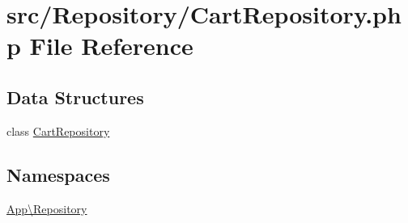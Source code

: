 \hypertarget{_cart_repository_8php}{}\section{src/\+Repository/\+Cart\+Repository.php File Reference}
\label{_cart_repository_8php}
\subsection*{Data Structures}
\begin{DoxyCompactItemize}
\item 
class \mbox{\hyperlink{class_app_1_1_repository_1_1_cart_repository}{Cart\+Repository}}
\end{DoxyCompactItemize}
\subsection*{Namespaces}
\begin{DoxyCompactItemize}
\item 
 \mbox{\hyperlink{namespace_app_1_1_repository}{App\textbackslash{}\+Repository}}
\end{DoxyCompactItemize}
